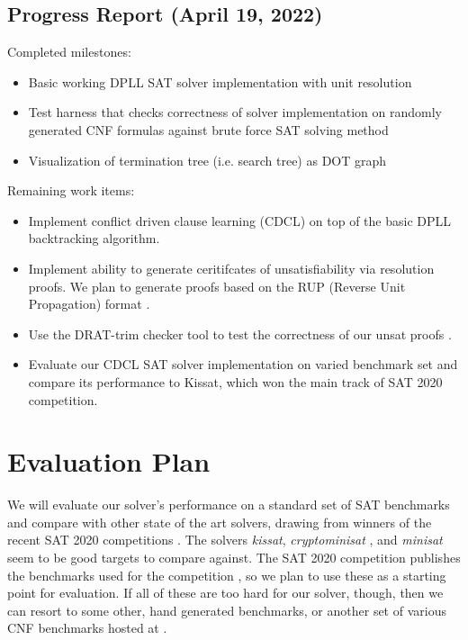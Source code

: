 \documentclass[12pt]{article}
\begin{document}
\subsection*{Progress Report (April 19, 2022)}

Completed milestones:

\begin{itemize}
    \item Basic working DPLL SAT solver implementation with unit resolution
    \item Test harness that checks correctness of solver implementation on randomly generated CNF formulas against brute force SAT solving method
    \item Visualization of termination tree (i.e. search tree) as DOT graph
\end{itemize}
Remaining work items:
\begin{itemize}
    \item Implement conflict driven clause learning (CDCL) on top of the basic DPLL backtracking algorithm.
    \item Implement ability to generate ceritifcates of unsatisfiability via resolution proofs. We plan to generate proofs based on the RUP (Reverse Unit Propagation) format \cite{goldberg03,heule13}.
    \item Use the DRAT-trim checker tool to test the correctness of our unsat proofs \cite{drattrimtool}.
    \item Evaluate our CDCL SAT solver implementation on varied benchmark set and compare its performance to Kissat\cite{2020kissat}, which won the main track of SAT 2020 competition.
\end{itemize}


\section{Evaluation Plan}
We will evaluate our solver's performance on a standard set of SAT benchmarks and compare with other state of the art solvers, drawing from winners of the recent SAT 2020 competitions \cite{2020satresults}. The solvers \textit{kissat}\cite{2020kissat}, \textit{cryptominisat} \cite{09cryptominisat}, and \textit{minisat}\cite{minisat} seem to be good targets to compare against. The SAT 2020 competition publishes the benchmarks used for the competition \cite{sat2020benchmarks}, so we plan to use these as a starting point for evaluation. If all of these are too hard for our solver, though, then we can resort to some other, hand generated benchmarks, or another set of various CNF benchmarks hosted at \cite{dimacsCNF}.



\end{document}
